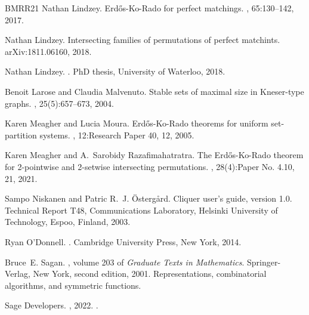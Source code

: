 \documentclass[10pt,a4paper]{article}
\theoremstyle{definition}
\begin{document}
\begin{thebibliography}{BMRR21}
Nathan Lindzey.
\newblock Erd{\H{o}}s-{K}o-{R}ado for perfect matchings.
, 65:130--142, 2017.

Nathan Lindzey.
\newblock Intersecting families of permutations of perfect matchints.
\newblock arXiv:1811.06160, 2018.

Nathan Lindzey.
.
\newblock PhD thesis, University of Waterloo, 2018.

Benoit Larose and Claudia Malvenuto.
\newblock Stable sets of maximal size in {K}neser-type graphs.
, 25(5):657--673, 2004.

Karen Meagher and Lucia Moura.
\newblock Erd{\H{o}}s-{K}o-{R}ado theorems for uniform set-partition systems.
, 12:Research Paper 40, 12, 2005.

Karen Meagher and A.~Sarobidy Razafimahatratra.
\newblock The {E}rd{\H{o}}s-{K}o-{R}ado theorem for 2-pointwise and 2-setwise
  intersecting permutations.
, 28(4):Paper No. 4.10, 21, 2021.

Sampo Niskanen and Patric R.~J. {\"O}sterg{\aa}rd.
\newblock Cliquer user's guide, version 1.0.
\newblock Technical Report T48, Communications Laboratory, Helsinki University
  of Technology, Espoo, Finland, 2003.

Ryan O'Donnell.
.
\newblock Cambridge University Press, New York, 2014.

Bruce~E. Sagan.
, volume 203 of {\em Graduate Texts in
  Mathematics}.
\newblock Springer-Verlag, New York, second edition, 2001.
\newblock Representations, combinatorial algorithms, and symmetric functions.

{Sage Developers}.
, 2022.
.

\end{thebibliography}
\end{document}
